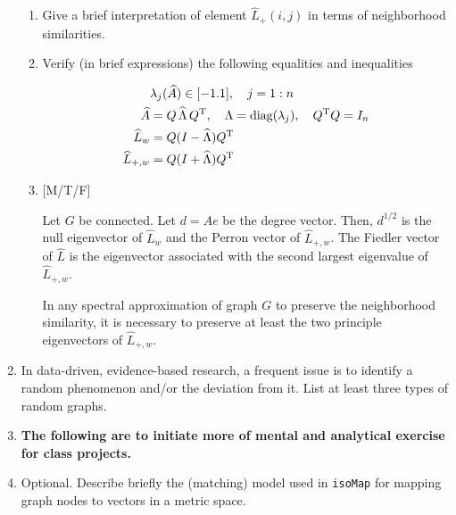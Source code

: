 \begin{enumerate}
\begin{enumerate}
     \item Give a brief interpretation of element
       $\widehat{L}_{+}(i,j)$ in terms of neighborhood similarities. 
       
     \item Verify (in brief expressions) the following equalities and
       inequalities

       \begin{equation}
         \begin{aligned}
           & \lambda_{j}(\widehat{A} ) 
           \in [-1.1], \quad j=1:n 
           \\
           \widehat{A} & = Q\, \widehat{\Lambda}\,  Q^{\rm T},
           \quad \Lambda = \mbox{\rm diag}(\lambda_j), 
           \quad Q^{\rm T}Q = I_{n} 
           \\
           \widehat{L}_{w} & = Q (I - \widehat{\Lambda}) Q^{\rm T}
             \\
           \widehat{L}_{+,w} &  = Q (I + \widehat{\Lambda}) Q^{\rm T}             
         \end{aligned} 
         \end{equation}
       \item { [M/T/F] } 

         Let $G$ be connected. Let $d = Ae$ be the degree vector. Then,
         $d^{1/2}$ is the null eigenvector of $\widehat{L}_{w}$ and
         the Perron vector of $\widehat{L}_{+,w}$. The Fiedler vector
         of $\widehat{L}$ is the eigenvector associated with the
         second largest eigenvalue of $\widehat{L}_{+,w}$. 

         In any spectral approximation of graph $G$ to preserve
         the neighborhood similarity, it is necessary to preserve
         at least the two principle eigenvectors of
         $\widehat{L}_{+,w}$. 
         
     \end{enumerate}
 \item In data-driven, evidence-based research, a frequent issue is to
   identify a random phenomenon and/or the deviation from it.  List at
   least three types of random graphs.

 \item[]
   {\bf \small The following are to initiate more of mental and analytical
   exercise for class projects.} 
   
 \item {\rm Optional.} Describe briefly the (matching) model used in
   \texttt{isoMap} for mapping graph nodes to vectors in a metric
   space.
   

\end{enumerate}
